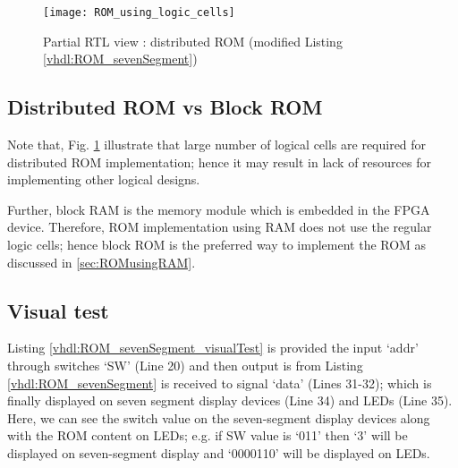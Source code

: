 \begin{figure}[!h]
	\centering
	\texttt{[image: ROM\_using\_logic\_cells]}
	\caption{Partial RTL view : distributed ROM  (modified Listing \ref{vhdl:ROM_sevenSegment})}
	\label{fig:ROM_using_logic_cells}
\end{figure}

\subsection{Distributed ROM vs Block ROM}

Note that, Fig. \ref{fig:ROM_using_logic_cells} illustrate that large number of logical cells are required for distributed ROM implementation; hence it may result in lack of resources for implementing other logical designs. 

Further, block RAM is the memory module which is embedded in the FPGA device.  Therefore, ROM implementation using RAM does not use the regular logic cells; hence block ROM is the preferred way to implement the ROM as discussed in \ref{sec:ROMusingRAM}. 


\subsection{Visual test}
Listing \ref{vhdl:ROM_sevenSegment_visualTest} is provided the input `addr' through switches `SW' (Line 20) and then output is from Listing \ref{vhdl:ROM_sevenSegment} is received to signal `data' (Lines 31-32); which is finally displayed on seven segment display devices (Line 34) and LEDs (Line 35). Here, we can see the switch value on the seven-segment display devices along with the ROM content on LEDs; e.g. if SW value is `011' then `3' will be displayed on seven-segment display and `0000110' will be displayed on LEDs. 


